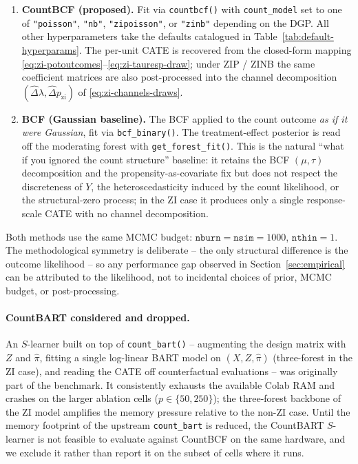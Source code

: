 \documentclass[11pt]{article}
\theoremstyle{plain}
\theoremstyle{definition}
\theoremstyle{remark}
\newcommand{\pihat}{\widehat{\pi}}
\newcommand{\Deltalam}{\Delta\lambda}
\newcommand{\Deltapzi}{\Delta p_{\mathrm{zi}}}
\begin{document}
\begin{enumerate}
  \item \textbf{CountBCF (proposed).} Fit via \verb|countbcf()| with
        \verb|count_model| set to one of \verb|"poisson"|,
        \verb|"nb"|, \verb|"zipoisson"|, or \verb|"zinb"| depending
        on the DGP. All other hyperparameters take the defaults
        catalogued in Table~\ref{tab:default-hyperparams}. The
        per-unit CATE is recovered from the closed-form mapping
        \eqref{eq:zi-potoutcomes}--\eqref{eq:zi-tauresp-draw}; under
        ZIP / ZINB the same coefficient matrices are also
        post-processed into the channel decomposition
        $(\widehat\Deltalam, \widehat\Deltapzi)$ of
        \eqref{eq:zi-channels-draws}.
  \item \textbf{BCF (Gaussian baseline).} The
        \citet{hahn2020bayesian} BCF applied to the count outcome
        \emph{as if it were Gaussian}, fit via \verb|bcf_binary()|.
        The treatment-effect posterior is read off the moderating
        forest with \verb|get_forest_fit()|. This is the natural
        ``what if you ignored the count structure'' baseline: it
        retains the BCF $(\mu, \tau)$ decomposition and the
        propensity-as-covariate fix but does not respect the
        discreteness of $Y$, the heteroscedasticity induced by the
        count likelihood, or the structural-zero process; in the ZI
        case it produces only a single response-scale CATE with no
        channel decomposition.
\end{enumerate}

Both methods use the same MCMC budget: $\mathtt{nburn} =
\mathtt{nsim} = 1000$, $\mathtt{nthin} = 1$. The methodological
symmetry is deliberate -- the only structural difference is the
outcome likelihood -- so any performance gap observed in
Section~\ref{sec:empirical} can be attributed to the likelihood, not
to incidental choices of prior, MCMC budget, or post-processing.

\paragraph{CountBART considered and dropped.}
An $S$-learner built on top of \verb|count_bart()| -- augmenting the
design matrix with $Z$ and $\pihat$, fitting a single log-linear BART
model on $(X, Z, \pihat)$ (three-forest in the ZI case), and reading
the CATE off counterfactual evaluations -- was originally part of the
benchmark. It consistently exhausts the available Colab RAM and
crashes on the larger ablation cells ($p \in \{50, 250\}$); the
three-forest backbone of the ZI model amplifies the memory pressure
relative to the non-ZI case. Until the memory footprint of the
upstream \texttt{count\_bart} is reduced, the CountBART $S$-learner is
not feasible to evaluate against CountBCF on the same hardware, and
we exclude it rather than report it on the subset of cells where it
runs.
\end{document}
